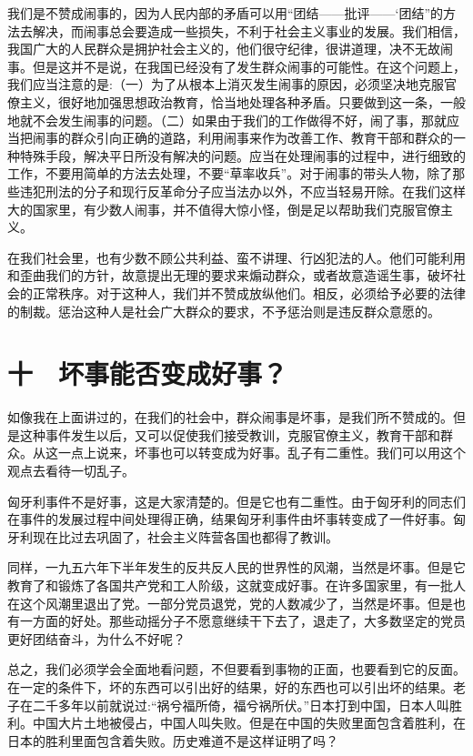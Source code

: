 我们是不赞成闹事的，因为人民内部的矛盾可以用“团结——批评——‘团结”的方法去解决，而闹事总会要造成一些损失，不利于社会主义事业的发展。我们相信，我国广大的人民群众是拥护社会主义的，他们很守纪律，很讲道理，决不无故闹事。但是这并不是说，在我国已经没有了发生群众闹事的可能性。在这个问题上，我们应当注意的是:（一）为了从根本上消灭发生闹事的原因，必须坚决地克服官僚主义，很好地加强思想政治教育，恰当地处理各种矛盾。只要做到这一条，一般地就不会发生闹事的问题。（二）如果由于我们的工作做得不好，闹了事，那就应当把闹事的群众引向正确的道路，利用闹事来作为改善工作、教育干部和群众的一种特殊手段，解决平日所没有解决的问题。应当在处理闹事的过程中，进行细致的工作，不要用简单的方法去处理，不要“草率收兵”。对于闹事的带头人物，除了那些违犯刑法的分子和现行反革命分子应当法办以外，不应当轻易开除。在我们这样大的国家里，有少数人闹事，并不值得大惊小怪，倒是足以帮助我们克服官僚主义。

在我们社会里，也有少数不顾公共利益、蛮不讲理、行凶犯法的人。他们可能利用和歪曲我们的方针，故意提出无理的要求来煽动群众，或者故意造谣生事，破坏社会的正常秩序。对于这种人，我们并不赞成放纵他们。相反，必须给予必要的法律的制裁。惩治这种人是社会广大群众的要求，不予惩治则是违反群众意愿的。

\section{十　坏事能否变成好事？}

如像我在上面讲过的，在我们的社会中，群众闹事是坏事，是我们所不赞成的。但是这种事件发生以后，又可以促使我们接受教训，克服官僚主义，教育干部和群众。从这一点上说来，坏事也可以转变成为好事。乱子有二重性。我们可以用这个观点去看待一切乱子。

匈牙利事件不是好事，这是大家清楚的。但是它也有二重性。由于匈牙利的同志们在事件的发展过程中间处理得正确，结果匈牙利事件由坏事转变成了一件好事。匈牙利现在比过去巩固了，社会主义阵营各国也都得了教训。

同样，一九五六年下半年发生的反共反人民的世界性的风潮，当然是坏事。但是它教育了和锻炼了各国共产党和工人阶级，这就变成好事。在许多国家里，有一批人在这个风潮里退出了党。一部分党员退党，党的人数减少了，当然是坏事。但是也有一方面的好处。那些动摇分子不愿意继续干下去了，退走了，大多数坚定的党员更好团结奋斗，为什么不好呢？

总之，我们必须学会全面地看问题，不但要看到事物的正面，也要看到它的反面。在一定的条件下，坏的东西可以引出好的结果，好的东西也可以引出坏的结果。老子在二千多年以前就说过:“祸兮福所倚，福兮祸所伏。”日本打到中国，日本人叫胜利。中国大片土地被侵占，中国人叫失败。但是在中国的失败里面包含着胜利，在日本的胜利里面包含着失败。历史难道不是这样证明了吗？

